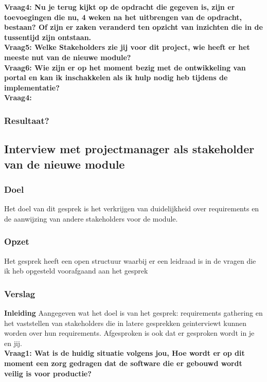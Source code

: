 \textbf{Vraag4: Nu je terug kijkt op de opdracht die gegeven is, zijn er toevoegingen die nu, 4 weken na het uitbrengen van de opdracht, bestaan? Of zijn er zaken veranderd ten opzicht van inzichten die in de tussentijd zijn ontstaan.}
\lipsum[05]\\

\textbf{Vraag5: Welke Stakeholders zie jij voor dit project, wie heeft er het meeste nut van de nieuwe module? }
\lipsum[06]\\

\textbf{Vraag6: Wie zijn er op het moment bezig met de ontwikkeling van portal en kan ik inschakkelen als ik hulp nodig heb tijdens de implementatie?}
\lipsum[09]\\
\textbf{Vraag4: }
\lipsum[07]\\

\subsubsection{Resultaat?}

\subsection{Interview met projectmanager als stakeholder van de nieuwe module}
\subsubsection{Doel}
Het doel van dit gesprek is het verkrijgen van duidelijkheid over requirements en de aanwijzing van andere stakeholders voor de module.
\subsubsection{Opzet}
Het gesprek heeft een open structuur waarbij er een leidraad is in de vragen die ik heb opgesteld voorafgaand aan het gesprek
\subsubsection{Verslag}
\textbf{Inleiding}
Aangegeven wat het doel is van het gesprek: requirements gathering en het vaststellen van stakeholders die in latere gesprekken geinterviewt kunnen worden over hun requirements. Afgesproken is ook dat er gesproken wordt in je en jij.\\
\textbf{Vraag1: Wat is de huidig situatie volgens jou, Hoe wordt er op dit moment een zorg gedragen dat de software die er gebouwd wordt veilig is voor productie?}
\lipsum[01]\\

